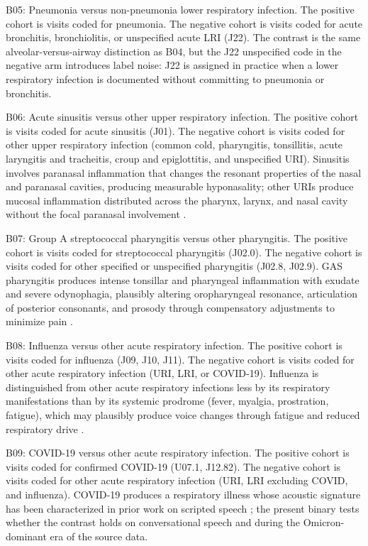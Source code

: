 \documentclass[utf8]{FrontiersinHarvard} %
\begin{document}
B05: Pneumonia versus non-pneumonia lower respiratory infection. The positive cohort is visits coded for pneumonia. The negative cohort is visits coded for acute bronchitis, bronchiolitis, or unspecified acute LRI (J22). The contrast is the same alveolar-versus-airway distinction as B04, but the J22 unspecified code in the negative arm introduces label noise: J22 is assigned in practice when a lower respiratory infection is documented without committing to pneumonia or bronchitis.

B06: Acute sinusitis versus other upper respiratory infection. The positive cohort is visits coded for acute sinusitis (J01). The negative cohort is visits coded for other upper respiratory infection (common cold, pharyngitis, tonsillitis, acute laryngitis and tracheitis, croup and epiglottitis, and unspecified URI). Sinusitis involves paranasal inflammation that changes the resonant properties of the nasal and paranasal cavities, producing measurable hyponasality; other URIs produce mucosal inflammation distributed across the pharynx, larynx, and nasal cavity without the focal paranasal involvement \citep{sinusitis-hyponasality-acoustic}.

B07: Group A streptococcal pharyngitis versus other pharyngitis. The positive cohort is visits coded for streptococcal pharyngitis (J02.0). The negative cohort is visits coded for other specified or unspecified pharyngitis (J02.8, J02.9). GAS pharyngitis produces intense tonsillar and pharyngeal inflammation with exudate and severe odynophagia, plausibly altering oropharyngeal resonance, articulation of posterior consonants, and prosody through compensatory adjustments to minimize pain \citep{gas-pharyngitis-voice-articulation}.

B08: Influenza versus other acute respiratory infection. The positive cohort is visits coded for influenza (J09, J10, J11). The negative cohort is visits coded for other acute respiratory infection (URI, LRI, or COVID-19). Influenza is distinguished from other acute respiratory infections less by its respiratory manifestations than by its systemic prodrome (fever, myalgia, prostration, fatigue), which may plausibly produce voice changes through fatigue and reduced respiratory drive \citep{behrman-speech-voice-science-2023}.

B09: COVID-19 versus other acute respiratory infection. The positive cohort is visits coded for confirmed COVID-19 (U07.1, J12.82). The negative cohort is visits coded for other acute respiratory infection (URI, LRI excluding COVID, and influenza). COVID-19 produces a respiratory illness whose acoustic signature has been characterized in prior work on scripted speech \citep{covid19-voice-acoustic-prior-work,covid19-voice-acoustic-prior-work-2,covid19-voice-acoustic-prior-work-3}; the present binary tests whether the contrast holds on conversational speech and during the Omicron-dominant era of the source data.
\end{document}

